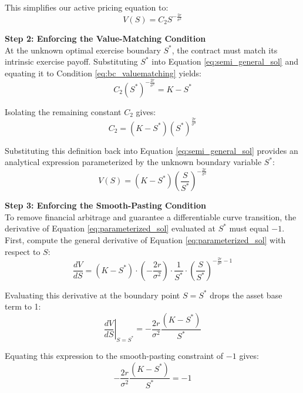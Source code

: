 \documentclass[12pt]{article}
\theoremstyle{definition}
\numberwithin{equation}{section}
\begin{document}
This simplifies our active pricing equation to:
\begin{equation}\label{eq:semi_general_sol}
V(S) = C_2 S^{-\frac{2r}{\sigma^2}}
\end{equation}

\textbf{Step 2: Enforcing the Value-Matching Condition} \\
At the unknown optimal exercise boundary $S^*$, the contract must match its intrinsic exercise payoff. Substituting $S^*$ into Equation \eqref{eq:semi_general_sol} and equating it to Condition \eqref{eq:bc_valuematching} yields:
\begin{equation}\label{eq:value_match_applied}
C_2 (S^*)^{-\frac{2r}{\sigma^2}} = K - S^*
\end{equation}

Isolating the remaining constant $C_2$ gives:
\begin{equation}\label{eq:c2_isolated}
C_2 = (K - S^*)(S^*)^{\frac{2r}{\sigma^2}}
\end{equation}

Substituting this definition back into Equation \eqref{eq:semi_general_sol} provides an analytical expression parameterized by the unknown boundary variable $S^*$:
\begin{equation}\label{eq:parameterized_sol}
V(S) = (K - S^*)\left(\frac{S}{S^*}\right)^{-\frac{2r}{\sigma^2}}
\end{equation}

\textbf{Step 3: Enforcing the Smooth-Pasting Condition} \\
To remove financial arbitrage and guarantee a differentiable curve transition, the derivative of Equation \eqref{eq:parameterized_sol} evaluated at $S^*$ must equal $-1$. First, compute the general derivative of Equation \eqref{eq:parameterized_sol} with respect to $S$:
\begin{equation}
\frac{dV}{dS} = (K - S^*)\cdot\left(-\frac{2r}{\sigma^2}\right)\cdot\frac{1}{S^*}\cdot\left(\frac{S}{S^*}\right)^{-\frac{2r}{\sigma^2}-1}
\end{equation}

Evaluating this derivative at the boundary point $S = S^*$ drops the asset base term to 1:
\begin{equation}
\left. \frac{dV}{dS} \right| _{S=S^*} = -\frac{2r}{\sigma^2}\frac{(K - S^*)}{S^*}
\end{equation}

Equating this expression to the smooth-pasting constraint of $-1$ gives:
\begin{equation}
-\frac{2r}{\sigma^2}\frac{(K - S^*)}{S^*} = -1
\end{equation}
\end{document}
